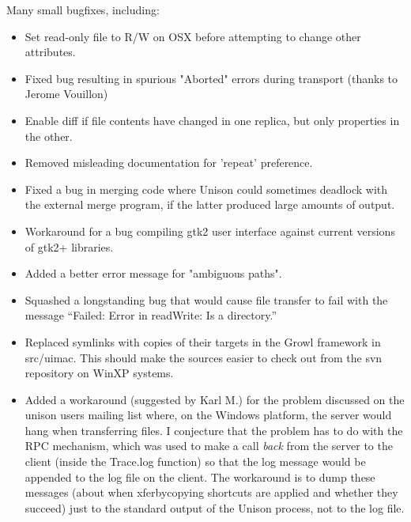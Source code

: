 \begin{changesfromversion}{2.17}
\item Many small bugfixes, including:
\begin{itemize}
\item Set read-only file to R/W on OSX before attempting to change other attributes.
\item Fixed bug resulting in spurious "Aborted" errors during transport
(thanks to Jerome Vouillon) 
\item Enable diff if file contents have changed in one replica, but
only properties in the other.
\item Removed misleading documentation for 'repeat' preference.
\item Fixed a bug in merging code where Unison could sometimes deadlock
  with the external merge program, if the latter produced large
  amounts of output.
\item Workaround for a bug compiling gtk2 user interface against current versions
  of gtk2+ libraries.  
\item Added a better error message for "ambiguous paths".
\item Squashed a longstanding bug that would cause file transfer to fail
  with the message ``Failed: Error in readWrite: Is a directory.''
\item Replaced symlinks with copies of their targets in the Growl framework in src/uimac.
  This should make the sources easier to check out from the svn repository on WinXP
  systems.
\item Added a workaround (suggested by Karl M.) for the problem discussed
  on the unison users mailing list where, on the Windows platform, the
  server would hang when transferring files.  I conjecture that
  the problem has to do with the RPC mechanism, which was used to
  make a call {\em back} from the server to the client (inside the Trace.log 
  function) so that the log message would be appended to the log file on 
  the client.  The workaround is to dump these messages (about when
  xferbycopying shortcuts are applied and whether they succeed) just to the
  standard output of the Unison process, not to the log file.
\end{itemize}
\end{changesfromversion}

